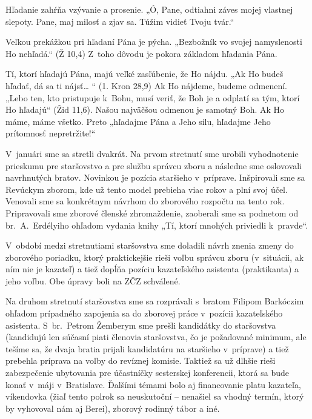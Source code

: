 Hľadanie zahŕňa vzývanie a prosenie. „Ó, Pane, odtiahni záves mojej vlastnej slepoty. Pane, maj milosť a zjav sa. Túžim vidieť Tvoju tvár.“


Veľkou prekážkou pri hľadaní Pána je pýcha. „Bezbožník vo svojej namyslenosti Ho nehľadá.“ (Ž 10,4) Z~toho dôvodu je pokora základom hľadania Pána.

Tí, ktorí hľadajú Pána, majú veľké zasľúbenie, že Ho nájdu. „Ak Ho budeš hľadať, dá sa ti nájsť… “ (1. Kron 28,9) Ak Ho nájdeme, budeme odmenení. „Lebo ten, kto pristupuje k~Bohu, musí veriť, že Boh je a odplatí sa tým, ktorí Ho hľadajú“ (Žid 11,6). Našou najväčšou odmenou je samotný Boh. Ak Ho máme, máme všetko. Preto „hľadajme Pána a Jeho silu, hľadajme Jeho prítomnosť nepretržite!“



V~januári sme sa stretli dvakrát. Na prvom stretnutí sme urobili vyhodnotenie prieskumu pre staršovstvo a pre službu správcu zboru a následne sme oslovovali navrhnutých bratov. Novinkou je pozícia staršieho v~príprave. Inšpirovali sme sa Revúckym zborom, kde už tento model prebieha viac rokov a plní svoj účel.
Venovali sme sa konkrétnym návrhom do zborového rozpočtu na tento rok. Pripravovali sme zborové členské zhromaždenie, zaoberali sme sa podnetom od br.~A.~Erdélyiho ohľadom vydania knihy „Tí, ktorí mnohých priviedli k~pravde“.

V~období medzi stretnutiami staršovstva sme doladili návrh znenia zmeny do zborového poriadku, ktorý praktickejšie rieši voľbu správcu zboru (v~situácii, ak ním nie je kazateľ) a tiež dopĺňa pozíciu kazateľského asistenta (praktikanta) a jeho voľbu. Obe úpravy boli na ZČZ schválené.

Na druhom stretnutí staršovstva sme sa rozprávali s~bratom Filipom Barkóczim ohľadom prípadného zapojenia sa do zborovej práce v~pozícii kazateľského asistenta. S~br.~Petrom Žemberym sme prešli kandidátky do staršovstva (kandidujú len súčasní piati členovia staršovstva, čo je požadované minimum, ale tešíme sa, že dvaja bratia prijali kandidatúru na staršieho v~príprave) a tiež prebehla príprava na voľby do revíznej komisie. Taktiež sa už dlhšie rieši zabezpečenie ubytovania pre účastníčky sesterskej konferencii, ktorá sa bude konať v~máji v~Bratislave. Ďalšími témami bolo aj financovanie platu kazateľa, víkendovka (žiaľ tento polrok sa neuskutoční -- nenašiel sa vhodný termín, ktorý by vyhovoval nám aj Berei), zborový rodinný tábor a iné.

